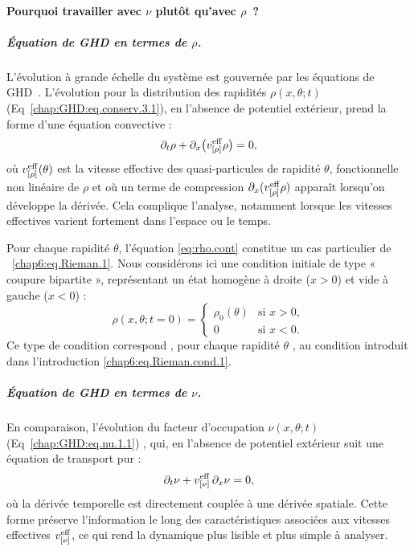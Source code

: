 \paragraph{Pourquoi travailler avec $\nu$ plutôt qu’avec $\rho$~?}
\subparagraph{Équation de GHD en termes de $\rho$.}
L’évolution à grande échelle du système est gouvernée par les équations de GHD~\cite{bertini_transport_2016, castro-alvaredo_emergent_2016}. 
L'évolution pour la distribution des rapidités $\rho(x,\theta;t)$ (Eq~\eqref{chap:GHD:eq.conserv.3.1}), en l'absence de potentiel extérieur, prend la forme d’une équation convective :
\begin{equation}
	\label{eq:rho.cont}
	\partial_t \rho + \partial_x \big( v^{\rm eff}_{[\rho]} \rho \big) = 0,
\end{equation}
où $v^{\rm eff}_{[\rho]}(\theta)$ est la vitesse effective des quasi-particules de rapidité $\theta$, fonctionnelle non linéaire de $\rho$ et où un terme de compression $\partial_x (v^{\rm eff}_{[\rho]} \rho)$ apparaît lorsqu’on développe la dérivée. Cela complique l’analyse, notamment lorsque les vitesses effectives varient fortement dans l’espace ou le temps.

\medskip

Pour chaque rapidité $\theta$, l'équation \eqref{eq:rho.cont} constitue un cas particulier de ~\eqref{chap6:eq.Rieman.1}.
Nous considérons ici une condition initiale de type « coupure bipartite », représentant un état homogène à droite ($x>0$) et vide à gauche ($x<0$) :
\begin{equation}
    \label{eq:rho.cont.init}
    \rho(x,\theta;t=0) = 
    \begin{cases}
        \rho_0(\theta) & \text{si } x > 0, \\
        0 & \text{si } x < 0.
    \end{cases}
\end{equation}
Ce type de condition correspond , pour chaque rapidité $\theta$ , au condition introduit dans l'introduction \eqref{chap6:eq.Rieman.cond.1}.\\

\subparagraph{Équation de GHD en termes de $\nu$.}
En comparaison, l’évolution du facteur d'occupation $\nu(x,\theta;t)$ (Eq~\eqref{chap:GHD:eq.nu.1.1}) , qui, en l’absence de potentiel extérieur suit une équation de transport pur :
\begin{equation}
    \label{eq:nu.cont}
    \partial_t \nu + v^{\rm eff}_{[\nu]} \, \partial_x \nu = 0,
\end{equation}
où la dérivée temporelle est directement couplée à une dérivée spatiale. Cette forme préserve l'information le long des caractéristiques associées aux vitesses effectives $v^{\rm eff}_{[\nu]}$, ce qui rend la dynamique plus lisible et plus simple à analyser.

